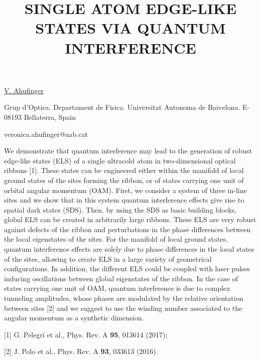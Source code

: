 \title{SINGLE ATOM EDGE-LIKE STATES VIA QUANTUM INTERFERENCE}

\underline{V. Ahufinger} 

{\normalsize{\vspace{-4mm}
Grup d'Optica. Departament de Fisica. Universitat Autonoma de Barcelona. E-08193 Bellaterra, Spain

\email veronica.ahufinger@uab.cat}}

We demonstrate that quantum interference may lead to the generation of robust edge-like states (ELS) of a single ultracold atom in two-dimensional optical ribbons [1]. These states can be engineered either within the manifold of local ground states of the sites forming the ribbon, or of states carrying one unit of orbital angular momentum (OAM). First, we consider a system of three in-line sites and we show that in this system quantum interference effects give rise to spatial dark states (SDS). Then, by using the SDS as basic building blocks, global ELS can be created in arbitrarily large ribbons. These ELS are very robust against defects of the ribbon and perturbations in the phase differences between the local eigenstates of the sites. For the manifold of local ground states, quantum interference effects are solely due to phase differences in the local states of the sites, allowing to create ELS in a large variety of geometrical configurations. In addition, the different ELS could be coupled with laser pulses inducing  oscillations  between global eigenstates of the ribbon. In the case of states carrying one unit of OAM, quantum interference is due to complex tunneling amplitudes, whose phases are modulated by the relative orientation between sites [2] and we suggest to use the winding number associated to the angular momentum as a synthetic dimension.

{\normalsize
[1] G. Pelegrí et al., Phys. Rev. A \textbf{95}, 013614 (2017);
\vsp

[2] J. Polo et al., Phys. Rev. A \textbf{93}, 033613 (2016).
}

\vspace{\baselineskip} 